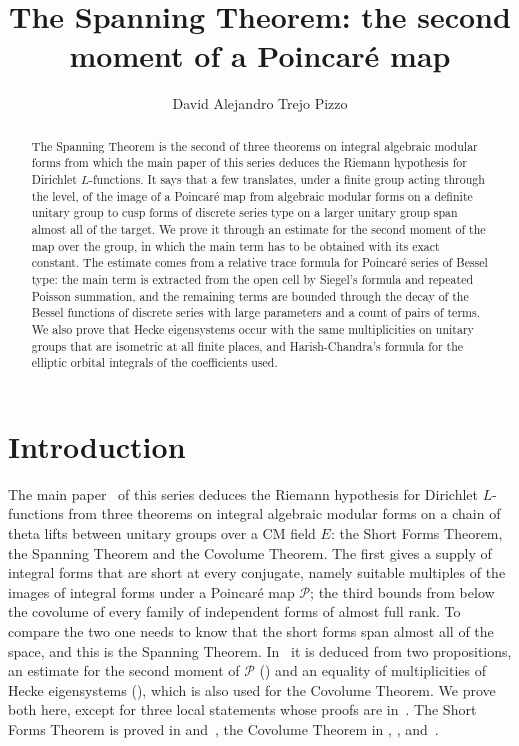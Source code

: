 \documentclass[10pt]{amsart}
\theoremstyle{definition}
\theoremstyle{remark}
\providecommand{\auP}{\mathcal P}
\begin{document}
\addtolength{\abovedisplayskip}{-3.4pt}
\addtolength{\belowdisplayskip}{-3.4pt}
\addtolength{\belowdisplayshortskip}{-2pt}
\title[The Spanning Theorem: the second moment]{The Spanning Theorem: the second moment of a Poincar\'e map}
\author{David Alejandro Trejo Pizzo}
\date{}
\begin{abstract}
The Spanning Theorem is the second of three theorems on integral algebraic modular forms from
which the main paper of this series deduces the Riemann hypothesis for Dirichlet $L$-functions.
It says that a few translates, under a finite group acting through the level, of the image of a
Poincar\'e map from algebraic modular forms on a definite unitary group to cusp forms of discrete
series type on a larger unitary group span almost all of the target. We prove it through an
estimate for the second moment of the map over the group, in which the main term has to be
obtained with its exact constant. The estimate comes from a relative trace formula for Poincar\'e
series of Bessel type: the main term is extracted from the open cell by Siegel's formula and
repeated Poisson summation, and the remaining terms are bounded through the decay of the Bessel
functions of discrete series with large parameters and a count of pairs of terms. We also prove
that Hecke eigensystems occur with the same multiplicities on unitary groups that are isometric
at all finite places, and Harish-Chandra's formula for the elliptic orbital integrals of the
coefficients used.
\end{abstract}
\maketitle
\setcounter{tocdepth}{1}\tableofcontents

\section{Introduction}\label{B1:intro}

The main paper~\cite{P46} of this series deduces the Riemann hypothesis for Dirichlet
$L$-functions from three theorems on integral algebraic modular forms on a chain of theta lifts
between unitary groups over a CM field $E$: the Short Forms Theorem, the Spanning Theorem and the
Covolume Theorem. The first gives a supply of integral forms that are short at every conjugate,
namely suitable multiples of the images of integral forms under a Poincar\'e map $\auP$; the
third bounds from below the covolume of every family of independent forms of almost full rank. To compare the two one needs to know that the short forms span almost all of the
space, and this is the Spanning Theorem. In~\cite{P46} it is deduced from two propositions, an
estimate for the second moment of $\auP$ ({\cite[Proposition~14.32]{P46}}) and an equality of
multiplicities of Hecke eigensystems ({\cite[Proposition~14.36]{P46}}), which is also used for the
Covolume Theorem. We prove both here, except for three local statements whose proofs
are in~\cite{P52}. The Short Forms Theorem is proved in \cite{P49} and~\cite{P50}, the Covolume
Theorem in \cite{P53}, \cite{P54}, \cite{P55} and~\cite{P56}.
\end{document}
